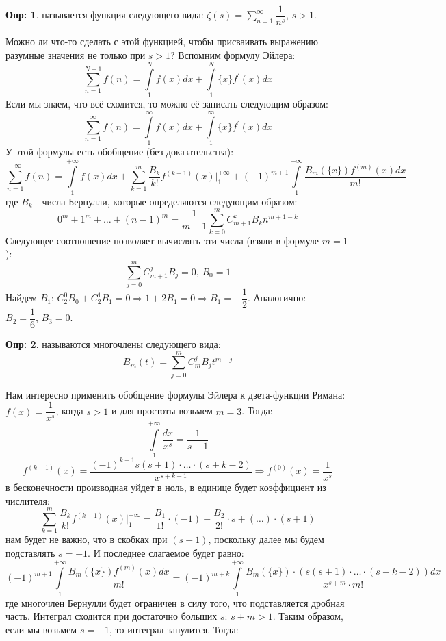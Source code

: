 \documentclass[12pt]{article}
\theoremstyle{definition}
\newtheorem{defn}{Опр:}
\newcommand{\ddsum}[2]{\displaystyle\sum\limits_{#1}^{#2}}
\newcommand{\ddint}[2]{\displaystyle\int\limits_{#1}^{#2}}
\begin{document}
\begin{defn}
	 называется функция следующего вида: $\zeta(s) = \ddsum{n =1}{\infty}\dfrac{1}{n^s}, \, s > 1$.
\end{defn}
Можно ли что-то сделать с этой функцией, чтобы присваивать выражению разумные значения не только при $s > 1$? Вспомним формулу Эйлера:
$$
	\ddsum{n =1}{N - 1} f(n) = \ddint{1}{N}f(x)dx + \ddint{1}{N}\{x\}f^\prime(x)dx
$$
Если мы знаем, что всё сходится, то можно её записать следующим образом:
$$
	\ddsum{n =1}{\infty} f(n) = \ddint{1}{\infty}f(x)dx + \ddint{1}{\infty}\{x\}f^\prime(x)dx
$$
У этой формулы есть обобщение (без доказательства):
$$
	\ddsum{n =1}{+\infty} f(n) = \ddint{1}{+\infty}f(x)dx + \ddsum{k = 1}{m}\dfrac{B_k}{k!}f^{(k-1)}(x)\bigg|_1^{+\infty} + (-1)^{m+1}\ddint{1}{+\infty}\dfrac{B_m(\{x\})f^{(m)}(x)dx}{m!}
$$
где $B_k$ - числа Бернулли, которые определяются следующим образом:
$$
	0^m + 1^m + \dotsc + (n-1)^m = \dfrac{1}{m+1}\ddsum{k = 0}{m}C_{m + 1}^k B_k n^{m+1 - k}
$$
Следующее соотношение позволяет вычислять эти числа (взяли в формуле $m = 1$):
$$
	\ddsum{j = 0}{m}C_{m+1}^jB_j = 0, \, B_0 = 1
$$
Найдем $B_1$: $C_2^0 B_0 + C_2^1 B_1 = 0 \Rightarrow 1 + 2 B_1 = 0 \Rightarrow B_1 = -\dfrac{1}{2}$. Аналогично: $B_2 = \dfrac{1}{6}, \, B_3 = 0$. 
\begin{defn}
	 называются многочлены следующего вида: 
	$$
		B_m(t) = \ddsum{j = 0}{m}C_m^j B_j t^{m - j}
	$$
\end{defn}
Нам интересно применить обобщение формулы Эйлера к дзета-функции Римана: $f(x) = \dfrac{1}{x^s}$, когда  $s > 1$ и для простоты возьмем $m = 3$. Тогда:
$$
	\ddint{1}{+\infty}\dfrac{dx}{x^s} = \dfrac{1}{s - 1}
$$
$$
	f^{(k-1)}(x) = \dfrac{(-1)^{k-1} s(s + 1){\cdot}\dotsc {\cdot}(s + k -2 )}{x^{s + k - 1}} \Rightarrow f^{(0)}(x) = \dfrac{1}{x^s}
$$
в бесконечности производная уйдет в ноль, в единице будет коэффициент из числителя:
$$
	\ddsum{k = 1}{m}\dfrac{B_k}{k!}f^{(k-1)}(x)\bigg|_1^{+\infty} = \dfrac{B_1}{1!}{\cdot}(-1) + \dfrac{B_2}{2!}{\cdot}s + (\dotsc) {\cdot}(s + 1)
$$
нам будет не важно, что в скобках при $(s+1)$, поскольку далее мы будем подставлять $s = -1$. И последнее слагаемое будет равно:
$$
	(-1)^{m+1}\ddint{1}{+\infty}\dfrac{B_m(\{x\})f^{(m)}(x)dx}{m!} = (-1)^{m+k}\ddint{1}{+\infty}\dfrac{B_m(\{x\}){\cdot}(s(s+1){\cdot}{\dotsc}{\cdot}(s + k -2))dx}{x^{s + m}{\cdot}m!}
$$
где многочлен Бернулли будет ограничен в силу того, что подставляется дробная часть. Интеграл сходится при достаточно больших $s$: $s + m > 1$. Таким образом, если мы возьмем $s = -1$, то интеграл занулится. Тогда:
\end{document}
